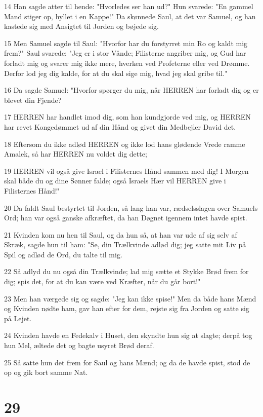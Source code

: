 \par 14 Han sagde atter til hende: "Hvorledes ser han ud?" Hun svarede: "En gammel Mand stiger op, hyllet i en Kappe!" Da skønnede Saul, at det var Samuel, og han kastede sig med Ansigtet til Jorden og bøjede sig.
\par 15 Men Samuel sagde til Saul: "Hvorfor har du forstyrret min Ro og kaldt mig frem?" Saul svarede: "Jeg er i stor Vånde; Filisterne angriber mig, og Gud har forladt mig og svarer mig ikke mere, hverken ved Profeterne eller ved Drømme. Derfor lod jeg dig kalde, for at du skal sige mig, hvad jeg skal gribe til."
\par 16 Da sagde Samuel: "Hvorfor spørger du mig, når HERREN har forladt dig og er blevet din Fjende?
\par 17 HERREN har handlet imod dig, som han kundgjorde ved mig, og HERREN har revet Kongedømmet ud af din Hånd og givet din Medbejler David det.
\par 18 Eftersom du ikke adlød HERREN og ikke lod hans glødende Vrede ramme Amalek, så har HERREN nu voldet dig dette;
\par 19 HERREN vil også give Israel i Filisternes Hånd sammen med dig! I Morgen skal både du og dine Sønner falde; også Israels Hær vil HERREN give i Filisternes Hånd!"
\par 20 Da faldt Saul bestyrtet til Jorden, så lang han var, rædselsslagen over Samuels Ord; han var også ganske afkræftet, da han Døgnet igennem intet havde spist.
\par 21 Kvinden kom nu hen til Saul, og da hun så, at han var ude af sig selv af Skræk, sagde hun til ham: "Se, din Trælkvinde adlød dig; jeg satte mit Liv på Spil og adlød de Ord, du talte til mig.
\par 22 Så adlyd du nu også din Trælkvinde; lad mig sætte et Stykke Brød frem for dig; spis det, for at du kan være ved Kræfter, når du går bort!"
\par 23 Men han værgede sig og sagde: "Jeg kan ikke spise!" Men da både hans Mænd og Kvinden nødte ham, gav han efter for dem, rejste sig fra Jorden og satte sig på Lejet.
\par 24 Kvinden havde en Fedekalv i Huset, den skyndte hun sig at slagte; derpå tog hun Mel, æltede det og bagte usyret Brød deraf.
\par 25 Så satte hun det frem for Saul og hans Mænd; og da de havde spist, stod de op og gik bort samme Nat.

\chapter{29}

